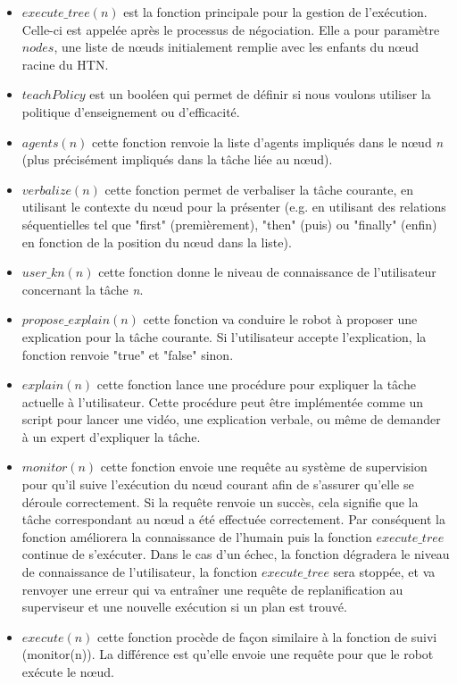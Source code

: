 \documentclass[a4paper,11pt,twoside]{StyleThese}
\begin{document}
\begin{itemize}
\item \textit{$execute\_tree(n)$} est la fonction principale pour la gestion de l'exécution. Celle-ci est appelée après le processus de négociation. Elle a pour paramètre \textit{$nodes$}, une liste de nœuds initialement remplie avec les  enfants du nœud racine du HTN.
\item \textit{$teachPolicy$} est un booléen qui permet de définir si nous voulons utiliser la politique d'enseignement ou d'efficacité.
\item \textit{$agents(n)$} cette fonction renvoie la liste d'agents impliqués dans le nœud \textit{n} (plus précisément impliqués dans la tâche liée au nœud).
\item \textit{$verbalize(n)$} cette fonction permet de verbaliser la tâche courante, en utilisant le contexte du nœud pour la présenter (e.g. en utilisant des relations séquentielles tel que "first" (premièrement), "then" (puis) ou "finally" (enfin) en fonction de la position du nœud dans la liste).
\item \textit{$user\_kn(n)$} cette fonction donne le niveau de connaissance de l'utilisateur concernant la tâche \textit{n}.
\item \textit{$propose\_explain(n)$} cette fonction va conduire le robot à proposer une explication pour la tâche courante. Si l'utilisateur accepte l'explication, la fonction renvoie "true" et "false" sinon.
\item \textit{$explain(n)$} cette fonction lance une procédure pour expliquer la tâche actuelle à l'utilisateur. Cette procédure peut être implémentée comme un script pour lancer une vidéo, une explication verbale, ou même de demander à un expert d'expliquer la tâche.
\item \textit{$monitor(n)$} cette fonction envoie une requête au système de supervision pour qu'il suive l'exécution du nœud courant afin de s'assurer qu'elle se déroule correctement. Si la requête renvoie un succès, cela signifie que la tâche correspondant au nœud a été effectuée correctement. Par conséquent la fonction améliorera la connaissance de l'humain puis la fonction \textit{$execute\_tree$} continue de s'exécuter. Dans le cas d'un échec, la fonction dégradera le niveau de connaissance de l'utilisateur, la fonction \textit{$execute\_tree$} sera stoppée, et va renvoyer une erreur qui va entraîner une requête de replanification au superviseur et une nouvelle exécution si un plan est trouvé.
\item \textit{$execute(n)$} cette fonction procède de façon similaire à la fonction de suivi (monitor(n)). La différence est qu'elle envoie une requête pour que le robot exécute le nœud.
\end{itemize}
 
\end{document}
